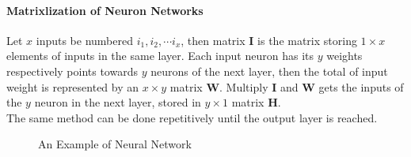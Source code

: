 	\paragraph{Matrixlization of Neuron Networks \cite{ref5}\\}
	Let $x$ inputs be numbered $i_1, i_2, \cdots i_x$, then matrix \textbf{I} is the matrix storing $1\times x$ elements of inputs in the same layer. 
	Each input neuron has its $y$ weights respectively points towards $y$ neurons of the next layer, then the total of input weight is represented by an $x\times y$ matrix \textbf{W}. Multiply \textbf{I} and \textbf{W} gets the inputs of the $y$  neuron in the next layer, stored in $ y\times 1$ matrix \textbf{H}. \\
	The same method can be done repetitively until the output layer is reached. 

 \begin{figure}[h!]
     \centering
    
     \caption{An Example of Neural Network}
     \label{fig:nn-graph}
 \end{figure}

	